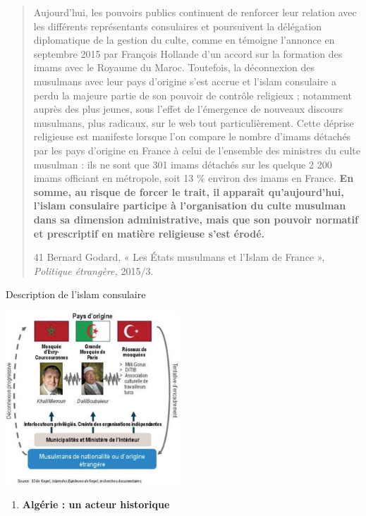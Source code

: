 \begin{quote}
Aujourd'hui, les pouvoirs publics continuent de renforcer leur relation
avec les différents représentants consulaires et poursuivent la
délégation diplomatique de la gestion du culte, comme en témoigne
l'annonce en septembre 2015 par François Hollande d'un accord sur la
formation des imams avec le Royaume du Maroc. Toutefois, la déconnexion
des musulmans avec leur pays d'origine s'est accrue et l'islam
consulaire a perdu la majeure partie de son pouvoir de contrôle
religieux ; notamment auprès des plus jeunes, sous l'effet de
l'émergence de nouveaux discours musulmans, plus radicaux, sur le web
tout particulièrement. Cette déprise religieuse est manifeste lorsque
l'on compare le nombre d'imams détachés par les pays d'origine en France
à celui de l'ensemble des ministres du culte musulman : ils ne sont que
301 imams détachés sur les quelque 2 200 imams officiant en métropole,
soit 13 \% environ des imams en France. \textbf{En somme, au risque de
forcer le trait, il apparaît qu'aujourd'hui, l'islam consulaire
participe à l'organisation du culte musulman dans sa dimension
administrative, mais que son pouvoir normatif et prescriptif en matière
religieuse s'est érodé.}

41 Bernard Godard, « Les États musulmans et l'Islam de France »,
\emph{Politique étrangère,} 2015/3.


\end{quote}

Description de l'islam consulaire

\includegraphics[width=2.57628in,height=2.55833in]{ImageIslamFrance/media/image7.jpeg}

\begin{enumerate}
\def\labelenumi{\arabic{enumi}.}
\item
  \textbf{Algérie : un acteur historique}
\end{enumerate}

